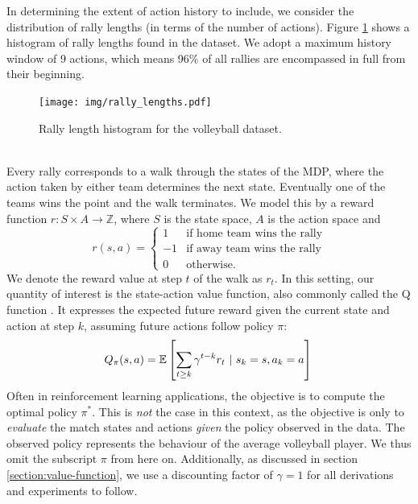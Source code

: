 \documentclass{sfuthesis}
\begin{document}
	In determining the extent of action history to include, we consider the distribution of rally lengths (in terms of the number of actions). Figure \ref{fig:rally-lengths} shows a histogram of rally lengths found in the dataset. We adopt a maximum history window of 9 actions, which means 96\% of all rallies are encompassed in full from their beginning.\\
	\begin{figure}
		\texttt{[image: img/rally\_lengths.pdf]}
		\caption{Rally length histogram for the volleyball dataset.}
		\label{fig:rally-lengths}
	\end{figure}
	\\
	Every rally corresponds to a walk through the states of the MDP, where the action taken by either team determines the next state. Eventually one of the teams wins the point and the walk terminates. We model this by a reward function $r: S \times A \rightarrow \mathbb{Z}$, where $S$ is the state space, $A$ is the action space and
	\begin{equation}
		r(s,a) =
		\begin{cases} 
			1 & \text{if home team wins the rally} \\
			-1 & \text{if away team wins the rally} \\
			0 & \text{otherwise.} 
		\end{cases}
		\label{eq:reward_function}
	\end{equation}
	We denote the reward value at step $t$ of the walk as $r_t$. In this setting, our quantity of interest is the state-action value function, also commonly called the Q function \cite{sutton2018reinforcement}. It expresses the expected future reward given the current state and action at step $k$, assuming future actions follow policy $\pi$:
	\begin{equation}
		Q_\pi(s,a) = \mathbb{E} \left[ \sum_{t \ge k} \gamma^{t-k} r_{t} \ | \ s_k = s, a_k = a \right]\\
		\label{eq:qfunction}
	\end{equation}
	Often in reinforcement learning applications, the objective is to compute the optimal policy $\pi^*$. This is {\em not} the case in this context, as the objective is only to {\em evaluate} the match states and actions {\em given} the policy observed in the data. The observed policy represents the behaviour of the average volleyball player. We thus omit the subscript $\pi$ from here on. Additionally, as discussed in section \ref{section:value-function}, we use a discounting factor of $\gamma=1$ for all derivations and experiments to follow.
	
\end{document}
